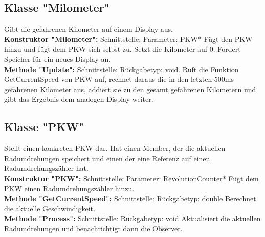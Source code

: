 \documentclass[12pt,a4paper]{article}
\begin{document}
\subsection {Klasse "Milometer"}
Gibt die gefahrenen Kilometer auf einem Display aus.
\\

\textbf {Konstruktor "Milometer": } 
\newline
Schnittstelle: 
\newline
Parameter: PKW*
\newline
Fügt den PKW hinzu und fügt dem PKW sich selbst zu. Setzt die Kilometer auf 0. Fordert Speicher für ein neues Display an.
\\

\textbf {Methode "Update": } 
\newline
Schnittstelle: 
\newline
Rückgabetyp: void.
\newline
Ruft die Funktion GetCurrentSpeed von PKW auf, rechnet daraus die in den letzten 500ms gefahrenen Kilometer aus, addiert sie zu den gesamt gefahrenen Kilometern und gibt das Ergebnis dem analogen Display weiter.
\\


\subsection {Klasse "PKW"}
Stellt einen konkreten PKW dar. Hat einen Member, der die aktuellen Radumdrehungen speichert und einen der eine Referenz auf einen Radumdrehungszähler hat.
\\

\textbf {Konstruktor "PKW": } 
\newline
Schnittstelle:
\newline
Parameter: RevolutionCounter*
\newline
Fügt dem PKW einen Radumdrehungszähler hinzu.
\\

\textbf {Methode "GetCurrentSpeed": } 
\newline
Schnittstelle:
\newline
Rückgabetyp: double
\newline
Berechnet die aktuelle Geschwindigkeit.
\\

\textbf {Methode "Process": } 
\newline
Schnittstelle:
\newline
Rückgabetyp: void
\newline
Aktualisiert die aktuellen Radumdrehungen und benachrichtigt dann die Observer.
\\
\end{document}
